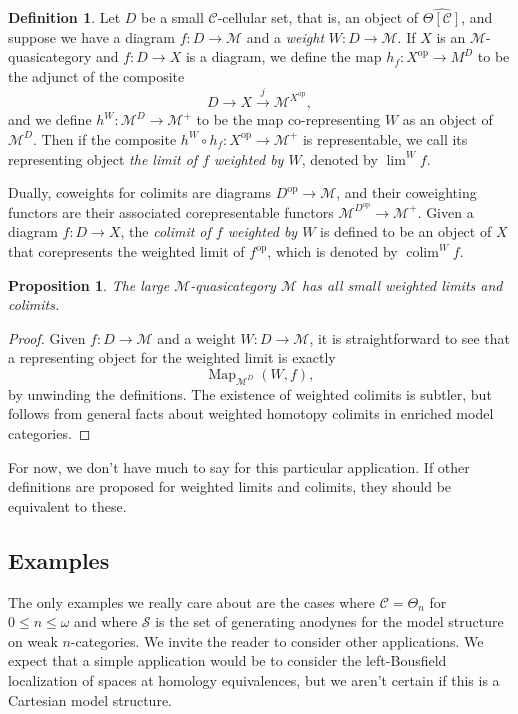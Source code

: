 \documentclass[a4paper]{article}
\numberwithin{equation}{subsection}
\theoremstyle{plain}   %
\newtheorem{prop}[equation]{Proposition}
\theoremstyle{definition}
\newtheorem{defn}[equation]{Definition}
\theoremstyle{remark}
\theoremstyle{plain}
\DeclareMathOperator{\colim}{colim}
\DeclareMathOperator{\limw}{lim}
\newcommand{\op}{\ensuremath{\mathrm{op}}}
\DeclareMathOperator{\Map}{Map}
\providecommand{\C}{}
\renewcommand{\C}{\ensuremath{\mathcal{C}}}
\newcommand{\M}{\ensuremath{\mathcal{M}}}
\newcommand{\setS}{\ensuremath{\mathscr{S}}}
\newcommand{\cellset}{\ensuremath{\widehat{\Theta[\mathcal{C}]}}}
\begin{document}
\begin{defn}
	Let \(D\) be a small \(\C\)-cellular set, that is, an object of \(\cellset\), and suppose we have a diagram \(f:D\to \M\) and a \emph{weight} \(W:D\to \M\).  If \(X\) is an \(\M\)-quasicategory and \(f:D\to X\) is a diagram, we define the map \(h_f: X^\op \to M^D\) to be the adjunct of the composite \[D\to X\xrightarrow{j} \M^{X^\op},\] and we define \(h^W:\M^D \to \M^+\) to be the map co-representing \(W\) as an object of \(\M^D\).  Then if the composite \(h^W\circ h_f:X^\op \to \M^+\) is representable, we call its representing object \emph{the limit of \(f\) weighted by \(W\)}, denoted  by \(\limw^W f\).

	Dually, coweights for colimits are diagrams \(D^\op \to \M\), and their coweighting functors are their associated corepresentable functors \(\M^{D^\op}\to \M^+\).  Given a diagram \(f:D\to X\), the \emph{colimit of \(f\) weighted by \(W\)} is defined to be an object of \(X\) that corepresents the weighted limit of \(f^\op\), which is denoted by \(\colim^W f\).  
\end{defn}

\begin{prop} The large \(\M\)-quasicategory \(\M\) has all small weighted limits and colimits.
\end{prop}
\begin{proof}  Given \(f:D\to \M\) and a weight \(W:D\to \M\), it is straightforward to see that a representing object for the weighted limit is exactly \[\Map_{\M^D}(W,f),\] by unwinding the definitions.  The existence of weighted colimits is subtler, but follows from general facts about weighted homotopy colimits in enriched model categories.
\end{proof}

For now, we don't have much to say for this particular application.  If other definitions are proposed for weighted limits and colimits, they should be equivalent to these.  

\subsection{Examples}
The only examples we really care about are the cases where \(\C=\Theta_n\) for \(0\leq n\leq \omega\) and where \(\setS\) is the set of generating anodynes for the model structure on weak \(n\)-categories.  We invite the reader to consider other applications.  We expect that a simple application would be to consider the left-Bousfield localization of spaces at homology equivalences, but we aren't certain if this is a Cartesian model structure.
\end{document}
